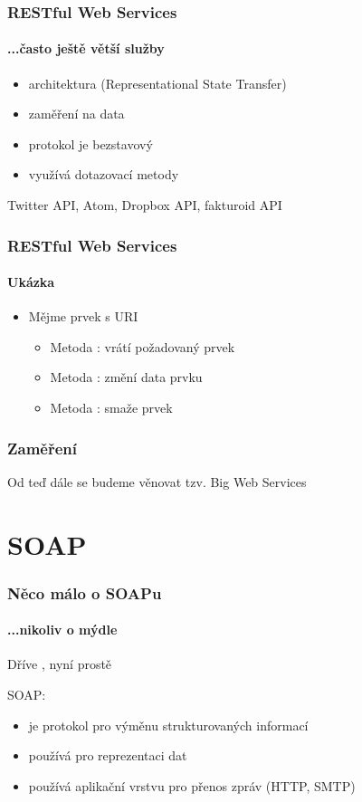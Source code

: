 \documentclass[12pt]{beamer}
\begin{document}
\begin{frame}
  \frametitle{RESTful Web Services}
  \framesubtitle{...často ještě větší služby}
	\begin{itemize}
		\item architektura  (Representational State Transfer)
		\item zaměření na data
		\item protokol je bezstavový
		\item využívá dotazovací metody 
	\end{itemize}
	\begin{example}
		Twitter API, Atom, Dropbox API, fakturoid API
	\end{example}
\end{frame}

\begin{frame}
	\frametitle{RESTful Web Services}
	\framesubtitle{Ukázka}
	\begin{itemize}
		\item Mějme prvek s URI 
		\begin{itemize}
			\item Metoda : vrátí požadovaný prvek
			\item Metoda : změní data prvku
			\item Metoda : smaže prvek
		\end{itemize}
	\end{itemize}
	
\end{frame}

\begin{frame}
  \frametitle{Zaměření}

  \begin{example}
    Od teď dále se budeme věnovat tzv. Big Web Services
  \end{example}
\end{frame}

\section{SOAP}

\begin{frame}
  \frametitle{Něco málo o SOAPu}
  \framesubtitle{...nikoliv o mýdle}

  Dříve , nyní prostě 

  \begin{block}{SOAP:}
    \begin{itemize}
      \item je protokol pro výměnu strukturovaných informací
      \item používá  pro reprezentaci dat
      \item používá aplikační vrstvu pro přenos zpráv (HTTP, SMTP)
    \end{itemize}
  \end{block}
\end{frame}
\end{document}
